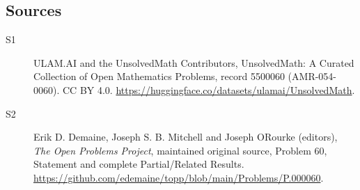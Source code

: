 \documentclass[11pt]{article}
\begin{document}
\subsection{Sources}
\begin{description}
\item[\hypertarget{source:5500060:1}{S1}] ULAM.AI and the UnsolvedMath Contributors, UnsolvedMath: A Curated Collection of Open Mathematics Problems, record 5500060 (AMR-054-0060). CC BY 4.0. \url{https://huggingface.co/datasets/ulamai/UnsolvedMath}.
\item[\hypertarget{source:5500060:2}{S2}] Erik D. Demaine, Joseph S. B. Mitchell and Joseph O\textquotesingle Rourke (editors), \emph{The Open Problems Project}, maintained original source, Problem 60, Statement and complete Partial/Related Results. \url{https://github.com/edemaine/topp/blob/main/Problems/P.000060}.
\end{description}
\label{end:5500060}
\end{document}
